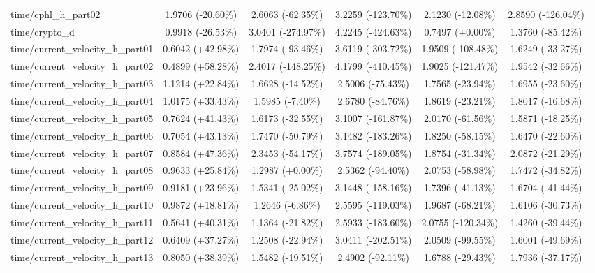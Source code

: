 \begin{table}[htbp]
{\begin{tabular}{lccccc}
time/cphl\_h\_part02 & 1.9706 (-20.60\%) & 2.6063 (-62.35\%) & 3.2259 (-123.70\%) & 2.1230 (-12.08\%) & 2.8590 (-126.04\%) \\
time/crypto\_d & 0.9918 (-26.53\%) & 3.0401 (-274.97\%) & 4.2245 (-424.63\%) & 0.7497 (+0.00\%) & 1.3760 (-85.42\%) \\
time/current\_velocity\_h\_part01 & 0.6042 (+42.98\%) & 1.7974 (-93.46\%) & 3.6119 (-303.72\%) & 1.9509 (-108.48\%) & 1.6249 (-33.27\%) \\
time/current\_velocity\_h\_part02 & 0.4899 (+58.28\%) & 2.4017 (-148.25\%) & 4.1799 (-410.45\%) & 1.9025 (-121.47\%) & 1.9542 (-32.66\%) \\
time/current\_velocity\_h\_part03 & 1.1214 (+22.84\%) & 1.6628 (-14.52\%) & 2.5006 (-75.43\%) & 1.7565 (-23.94\%) & 1.6955 (-23.60\%) \\
time/current\_velocity\_h\_part04 & 1.0175 (+33.43\%) & 1.5985 (-7.40\%) & 2.6780 (-84.76\%) & 1.8619 (-23.21\%) & 1.8017 (-16.68\%) \\
time/current\_velocity\_h\_part05 & 0.7624 (+41.43\%) & 1.6173 (-32.55\%) & 3.1007 (-161.87\%) & 2.0170 (-61.56\%) & 1.5871 (-18.25\%) \\
time/current\_velocity\_h\_part06 & 0.7054 (+43.13\%) & 1.7470 (-50.79\%) & 3.1482 (-183.26\%) & 1.8250 (-58.15\%) & 1.6470 (-22.60\%) \\
time/current\_velocity\_h\_part07 & 0.8584 (+47.36\%) & 2.3453 (-54.17\%) & 3.7574 (-189.05\%) & 1.8754 (-31.34\%) & 2.0872 (-21.29\%) \\
time/current\_velocity\_h\_part08 & 0.9633 (+25.84\%) & 1.2987 (+0.00\%) & 2.5362 (-94.40\%) & 2.0753 (-58.98\%) & 1.7472 (-34.82\%) \\
time/current\_velocity\_h\_part09 & 0.9181 (+23.96\%) & 1.5341 (-25.02\%) & 3.1448 (-158.16\%) & 1.7396 (-41.13\%) & 1.6704 (-41.44\%) \\
time/current\_velocity\_h\_part10 & 0.9872 (+18.81\%) & 1.2646 (-6.86\%) & 2.5595 (-119.03\%) & 1.9687 (-68.21\%) & 1.6106 (-30.73\%) \\
time/current\_velocity\_h\_part11 & 0.5641 (+40.31\%) & 1.1364 (-21.82\%) & 2.5933 (-183.60\%) & 2.0755 (-120.34\%) & 1.4260 (-39.44\%) \\
time/current\_velocity\_h\_part12 & 0.6409 (+37.27\%) & 1.2508 (-22.94\%) & 3.0411 (-202.51\%) & 2.0509 (-99.55\%) & 1.6001 (-49.69\%) \\
time/current\_velocity\_h\_part13 & 0.8050 (+38.39\%) & 1.5482 (-19.51\%) & 2.4902 (-92.11\%) & 1.6788 (-29.43\%) & 1.7936 (-37.17\%) \\

\end{tabular}}
\end{table}
